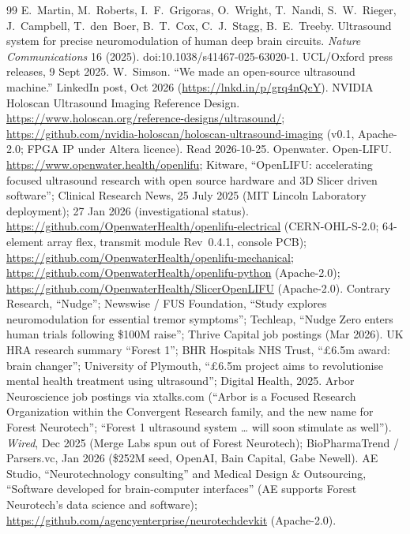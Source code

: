 \documentclass[11pt,a4paper]{article}
\begin{document}
\begin{thebibliography}{99}\small
{} E.~Martin, M.~Roberts, I.~F.~Grigoras, O.~Wright, T.~Nandi, S.~W.~Rieger, J.~Campbell, T.~den~Boer, B.~T.~Cox, C.~J.~Stagg, B.~E.~Treeby. Ultrasound system for precise neuromodulation of human deep brain circuits. \emph{Nature Communications} 16 (2025). doi:10.1038/s41467-025-63020-1. UCL/Oxford press releases, 9 Sept 2025.
 W.~Simson. ``We made an open-source ultrasound machine.'' LinkedIn post, Oct 2026 (\url{https://lnkd.in/p/grq4nQcY}).
 NVIDIA Holoscan Ultrasound Imaging Reference Design. \url{https://www.holoscan.org/reference-designs/ultrasound/}; \url{https://github.com/nvidia-holoscan/holoscan-ultrasound-imaging} (v0.1, Apache-2.0; FPGA IP under Altera licence). Read 2026-10-25.
 Openwater. Open-LIFU. \url{https://www.openwater.health/openlifu}; Kitware, ``OpenLIFU: accelerating focused ultrasound research with open source hardware and 3D Slicer driven software''; Clinical Research News, 25 July 2025 (MIT Lincoln Laboratory deployment); 27 Jan 2026 (investigational status).
 \url{https://github.com/OpenwaterHealth/openlifu-electrical} (CERN-OHL-S-2.0; 64-element array flex, transmit module Rev~0.4.1, console PCB); \url{https://github.com/OpenwaterHealth/openlifu-mechanical}; \url{https://github.com/OpenwaterHealth/openlifu-python} (Apache-2.0); \url{https://github.com/OpenwaterHealth/SlicerOpenLIFU} (Apache-2.0).
 Contrary Research, ``Nudge''; Newswise / FUS Foundation, ``Study explores neuromodulation for essential tremor symptoms''; Techleap, ``Nudge Zero enters human trials following \$100M raise''; Thrive Capital job postings (Mar 2026).
 UK HRA research summary ``Forest 1''; BHR Hospitals NHS Trust, ``\pounds6.5m award: brain changer''; University of Plymouth, ``\pounds6.5m project aims to revolutionise mental health treatment using ultrasound''; Digital Health, 2025.
 Arbor Neuroscience job postings via xtalks.com (``Arbor is a Focused Research Organization within the Convergent Research family, and the new name for Forest Neurotech''; ``Forest 1 ultrasound system \ldots{} will soon stimulate as well'').
 \emph{Wired}, Dec 2025 (Merge Labs spun out of Forest Neurotech); BioPharmaTrend / Parsers.vc, Jan 2026 (\$252M seed, OpenAI, Bain Capital, Gabe Newell).
 AE Studio, ``Neurotechnology consulting'' and Medical Design \& Outsourcing, ``Software developed for brain-computer interfaces'' (AE supports Forest Neurotech's data science and software); \url{https://github.com/agencyenterprise/neurotechdevkit} (Apache-2.0).

\end{thebibliography}
\end{document}
